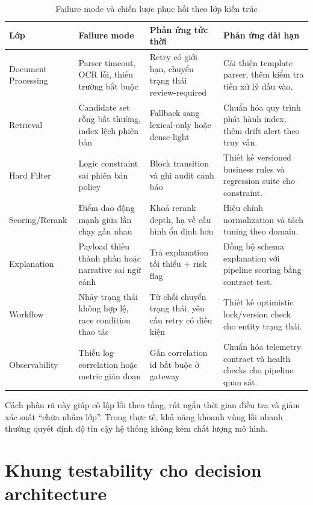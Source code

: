 \begin{table}[H]
\caption{Failure mode và chiến lược phục hồi theo lớp kiến trúc}
\centering
\begin{tabularx}{\textwidth}{p{}p{}p{}X}
\toprule
\textbf{Lớp} & \textbf{Failure mode} & \textbf{Phản ứng tức thời} & \textbf{Phản ứng dài hạn}\\
\midrule
Document Processing & Parser timeout, OCR lỗi, thiếu trường bắt buộc & Retry có giới hạn, chuyển trạng thái review-required & Cải thiện template parser, thêm kiểm tra tiền xử lý đầu vào.\\
Retrieval & Candidate set rỗng bất thường, index lệch phiên bản & Fallback sang lexical-only hoặc dense-light & Chuẩn hóa quy trình phát hành index, thêm drift alert theo truy vấn.\\
Hard Filter & Logic constraint sai phiên bản policy & Block transition và ghi audit cảnh báo & Thiết kế versioned business rules và regression suite cho constraint.\\
Scoring/Rerank & Điểm dao động mạnh giữa lần chạy gần nhau & Khoá rerank depth, hạ về cấu hình ổn định hơn & Hiệu chỉnh normalization và tách tuning theo domain.\\
Explanation & Payload thiếu thành phần hoặc narrative sai ngữ cảnh & Trả explanation tối thiểu + risk flag & Đồng bộ schema explanation với pipeline scoring bằng contract test.\\
Workflow & Nhảy trạng thái không hợp lệ, race condition thao tác & Từ chối chuyển trạng thái, yêu cầu retry có điều kiện & Thiết kế optimistic lock/version check cho entity trạng thái.\\
Observability & Thiếu log correlation hoặc metric gián đoạn & Gắn correlation id bắt buộc ở gateway & Chuẩn hóa telemetry contract và health checks cho pipeline quan sát.\\
\bottomrule
\end{tabularx}
\end{table}

Cách phân rã này giúp cô lập lỗi theo tầng, rút ngắn thời gian điều tra và giảm xác suất ``chữa nhầm lớp''. Trong thực tế, khả năng khoanh vùng lỗi nhanh thường quyết định độ tin cậy hệ thống không kém chất lượng mô hình.

\section{Khung testability cho decision architecture}

